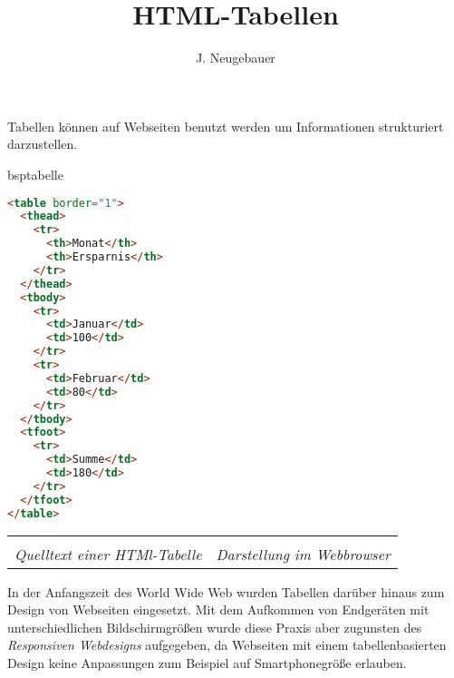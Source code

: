 \documentclass[a4paper,11pt,debug]{scrartcl}
\author{J. Neugebauer}
\title{HTML-Tabellen}
\date{\Heute}
\begin{document}
\ReiheTitel

Tabellen können auf Webseiten benutzt werden um Informationen strukturiert darzustellen.\medskip

\begin{savelst}{bsptabelle}
\begin{lstlisting}[language=HTML,linewidth=.45\textwidth]
<table border="1">
  <thead>
    <tr>
      <th>Monat</th>
      <th>Ersparnis</th>
    </tr>
  </thead>
  <tbody>
    <tr>
      <td>Januar</td>    
      <td>100</td>
    </tr>
    <tr>    
      <td>Februar</td>    
      <td>80</td>
    </tr>
  </tbody>
  <tfoot>
    <tr>
      <td>Summe</td>
      <td>180</td>
    </tr>
  </tfoot>
</table>
\end{lstlisting}
\end{savelst}
\begin{tabularx}{\textwidth}{XX}
	\loadlst{bsptabelle} & \\
	\scriptsize{\textit{Quelltext einer HTMl-Tabelle}} &
	\scriptsize{\textit{Darstellung im Webbrowser}} \\
\end{tabularx}

\begin{rahmen}\small
	In der Anfangszeit des World Wide Web wurden Tabellen darüber hinaus zum Design von Webseiten eingesetzt. Mit dem Aufkommen von Endgeräten mit unterschiedlichen Bildschirmgrößen wurde diese Praxis aber zugunsten des \emph{Responsiven Webdesigns} aufgegeben, da Webseiten mit einem tabellenbasierten Design keine Anpassungen zum Beispiel auf Smartphonegröße erlauben.
\end{rahmen}
\end{document}

